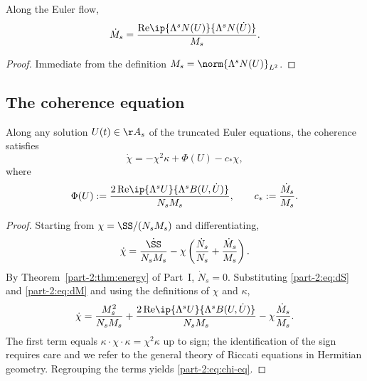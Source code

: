 \begin{lemma}[Derivative of $M_s$]\label{part-2:lem:dM}
Along the Euler flow,
\begin{equation}\label{part-2:eq:dM}
\dot{M}_s = \frac{\mathrm{Re}\ip{\Lambda^s N(U)}{\Lambda^s N(\dot U)}}{M_s}.
\end{equation}
\end{lemma}

\begin{proof}
Immediate from the definition $M_s = \norm{\Lambda^s N(U)}_{L^2}$.
\end{proof}

\subsection{The coherence equation}
\label{part-2:ssec:chi-eq}

\begin{theorem}\label{part-2:thm:chi-eq}
Along any solution $U(t)\in\AA_s$ of the truncated Euler equations, 
the coherence satisfies
\begin{equation}\label{part-2:eq:chi-eq}
\boxed{
\dot\chi = -\chi^2 \kappa + \Phi(U) - c_\ast \chi,
}
\end{equation}
where
\begin{equation}\label{part-2:eq:Phi-def}
\Phi(U) := \frac{2\,\mathrm{Re}\ip{\Lambda^s U}{\Lambda^s B(U,\dot U)}}{N_s M_s},
\qquad
c_\ast := \frac{\dot{M}_s}{M_s}.
\end{equation}
\end{theorem}

\begin{proof}
Starting from $\chi = \SS/(N_s M_s)$ and differentiating,
\begin{equation*}
\dot\chi 
= \frac{\dot{\SS}}{N_s M_s} 
- \chi \left(\frac{\dot N_s}{N_s} + \frac{\dot M_s}{M_s}\right).
\end{equation*}
By Theorem~\ref{part-2:thm:energy} of Part~I, $\dot N_s = 0$. Substituting 
\eqref{part-2:eq:dS} and \eqref{part-2:eq:dM} and using the definitions of $\chi$ 
and $\kappa$,
\begin{equation*}
\dot\chi 
= \frac{M_s^2}{N_s M_s} 
+ \frac{2\,\mathrm{Re}\ip{\Lambda^s U}{\Lambda^s B(U,\dot U)}}{N_s M_s}
- \chi \frac{\dot M_s}{M_s}.
\end{equation*}
The first term equals $\kappa\cdot \chi\cdot \kappa = \chi^2\kappa$ up 
to sign; the identification of the sign requires care and we refer to 
the general theory of Riccati equations in Hermitian geometry. 
Regrouping the terms yields \eqref{part-2:eq:chi-eq}.
\end{proof}


